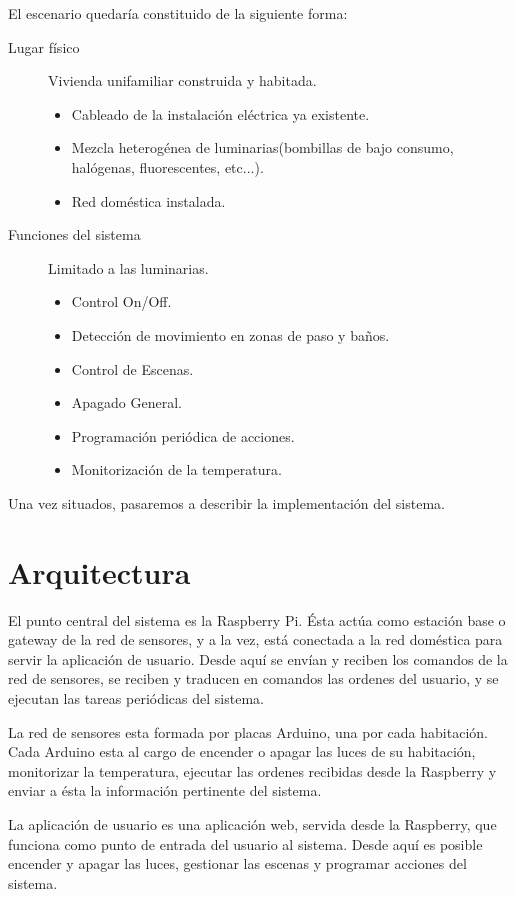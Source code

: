 El escenario quedaría constituido de la siguiente forma:
\begin{description}
    \item[Lugar físico] Vivienda unifamiliar construida y habitada.
        \begin{itemize}
            \item Cableado de la instalación eléctrica ya existente.
            \item Mezcla heterogénea de luminarias(bombillas de bajo consumo, halógenas, fluorescentes, etc...).
            \item Red doméstica instalada.
        \end{itemize}
    \item[Funciones del sistema] Limitado a las luminarias.
        \begin{itemize}
            \item Control On/Off.
            \item Detección de movimiento en zonas de paso y baños.
            \item Control de Escenas.
            \item Apagado General.
            \item Programación periódica de acciones.
            \item Monitorización de la temperatura.
        \end{itemize}
\end{description}

Una vez situados, pasaremos a describir la implementación del sistema.


\section{Arquitectura}
El punto central del sistema es la Raspberry Pi. Ésta actúa como estación base o gateway de la red de sensores, y a la vez, está conectada a la red doméstica para servir la aplicación de usuario. Desde aquí se envían y reciben los comandos de la red de sensores, se reciben y traducen en comandos las ordenes del usuario, y se ejecutan las tareas periódicas del sistema. 


La red de sensores esta formada por placas Arduino, una por cada habitación. Cada Arduino esta al cargo de encender o apagar las luces de su habitación, monitorizar la temperatura, ejecutar las ordenes recibidas desde la Raspberry y enviar a ésta la información pertinente del sistema.

La aplicación de usuario es una aplicación web, servida desde la Raspberry, que funciona como punto de entrada del usuario al sistema. Desde aquí es posible encender y apagar las luces, gestionar las escenas y programar acciones del sistema.

